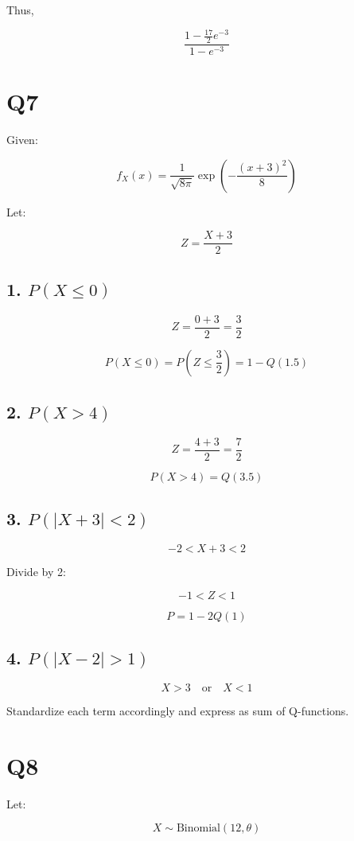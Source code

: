 \documentclass[12pt]{article}
\begin{document}
Thus,

\[
\frac{1 - \frac{17}{2}e^{-3}}{1 - e^{-3}}
\]

\section*{Q7}

Given:

\[
f_X(x)
=
\frac{1}{\sqrt{8\pi}}
\exp\left(-\frac{(x+3)^2}{8}\right)
\]

Let:

\[
Z = \frac{X+3}{2}
\]

\subsection*{1. $P(X \le 0)$}

\[
Z = \frac{0+3}{2} = \frac{3}{2}
\]

\[
P(X \le 0)
=
P\left(Z \le \frac{3}{2}\right)
=
1 - Q(1.5)
\]

\subsection*{2. $P(X > 4)$}

\[
Z = \frac{4+3}{2} = \frac{7}{2}
\]

\[
P(X > 4)
=
Q(3.5)
\]

\subsection*{3. $P(|X+3| < 2)$}

\[
-2 < X+3 < 2
\]

Divide by 2:

\[
-1 < Z < 1
\]

\[
P = 1 - 2Q(1)
\]

\subsection*{4. $P(|X-2| > 1)$}

\[
X > 3 \quad \text{or} \quad X < 1
\]

Standardize each term accordingly and express as sum of Q-functions.

\section*{Q8}

Let:

\[
X \sim \text{Binomial}(12,\theta)
\]
\end{document}
